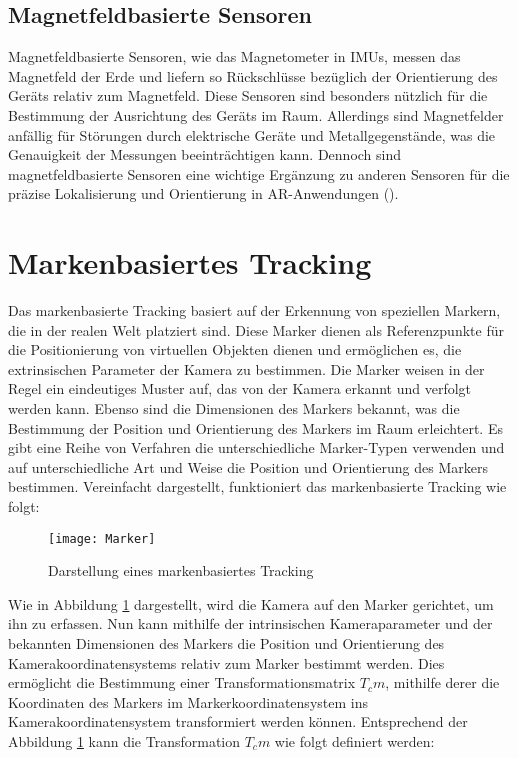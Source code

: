 \subsection{Magnetfeldbasierte Sensoren}

Magnetfeldbasierte Sensoren, wie das Magnetometer in IMUs, messen das Magnetfeld der Erde und liefern so Rückschlüsse bezüglich der Orientierung des Geräts relativ zum Magnetfeld. Diese Sensoren sind besonders nützlich für die Bestimmung der Ausrichtung des Geräts im Raum. Allerdings sind Magnetfelder anfällig für Störungen durch elektrische Geräte und Metallgegenstände, was die Genauigkeit der Messungen beeinträchtigen kann. Dennoch sind magnetfeldbasierte Sensoren eine wichtige Ergänzung zu anderen Sensoren für die präzise Lokalisierung und Orientierung in AR-Anwendungen (\cite{doerner2022virtual}).

\section{Markenbasiertes Tracking}\label{Markerbasiertes Tracking}

Das markenbasierte Tracking basiert auf der Erkennung von speziellen Markern, die in der realen Welt platziert sind. Diese Marker dienen als Referenzpunkte für die Positionierung von virtuellen Objekten dienen und ermöglichen es, die extrinsischen Parameter der Kamera zu bestimmen. Die Marker weisen in der Regel ein eindeutiges Muster auf, das von der Kamera erkannt und verfolgt werden kann. Ebenso sind die Dimensionen des Markers bekannt, was die Bestimmung der Position und Orientierung des Markers im Raum erleichtert. Es gibt eine Reihe von Verfahren die unterschiedliche Marker-Typen verwenden und auf unterschiedliche Art und Weise die Position und Orientierung des Markers bestimmen. Vereinfacht dargestellt, funktioniert das markenbasierte Tracking wie folgt:

\begin{figure}
    \centering
    \texttt{[image: Marker]}
    \caption{Darstellung eines markenbasiertes Tracking\label{fig:Marker}}\par
\end{figure}

Wie in Abbildung \ref{fig:Marker} dargestellt, wird die Kamera auf den Marker gerichtet, um ihn zu erfassen. Nun kann mithilfe der intrinsischen Kameraparameter und der bekannten Dimensionen des Markers die Position und Orientierung des Kamerakoordinatensystems relativ zum Marker bestimmt werden. Dies ermöglicht die Bestimmung einer Transformationsmatrix \( T_cm \), mithilfe derer die Koordinaten des Markers im Markerkoordinatensystem ins Kamerakoordinatensystem transformiert werden können. Entsprechend der Abbildung \ref{fig:Marker} kann die Transformation \( T_cm \) wie folgt definiert werden:

